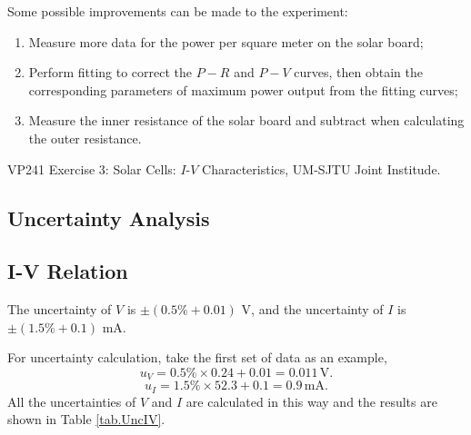 \documentclass{article}
\begin{document}
{Some possible improvements can be made to the experiment:
\begin{enumerate}
\item Measure more data for the power per square meter on the solar board;
\item Perform fitting to correct the $P-R$ and $P-V$ curves, then obtain the corresponding parameters of maximum power output from the fitting curves;
\item Measure the inner resistance of the solar board and subtract when calculating the outer resistance.
\end{enumerate}


\begin{thebibliography}{10}
	 VP241 Exercise 3: Solar Cells: $I$-$V$ Characteristics, UM-SJTU Joint Institude.
\end{thebibliography}

\newpage

\begin{appendix}

\section{Uncertainty Analysis}

\subsection{I-V Relation}
The uncertainty of $V$ is $\pm(0.5\%+0.01)$ V, and the uncertainty of $I$ is $\pm(1.5\%+0.1)$ mA. 

For uncertainty calculation, take the first set of data as an example,
$$u_{V} = 0.5\% \times 0.24 + 0.01 = 0.011\,\text{V}.$$
$$u_{I} = 1.5\% \times 52.3 + 0.1 = 0.9\,\text{mA}.$$
All the uncertainties of $V$ and $I$ are calculated in this way and the results are shown in Table \ref{tab.UncIV}.


\end{appendix}}
\end{document}
